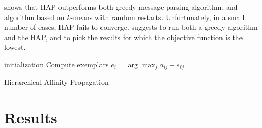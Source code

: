 \documentclass{ipol}
\begin{document}
\cite{hap} shows that HAP outperforms both greedy message parsing algorithm,
and algorithm based on $k$-means with random restarts. Unfortunately, in a
small number of cases, HAP fails to converge. \cite{hap} suggests to run both
a greedy algorithm and the HAP, and to pick the results for which the
objective function is the lowest.

\begin{algorithm}[h]
  \SetLine
  initialization\;
  Compute exemplars $e_i = \arg \max_{j} a_{ij} + s_{ij}$ \;
  \caption{Hierarchical Affinity Propagation}
\end{algorithm}

\section{Results}


\end{document}
